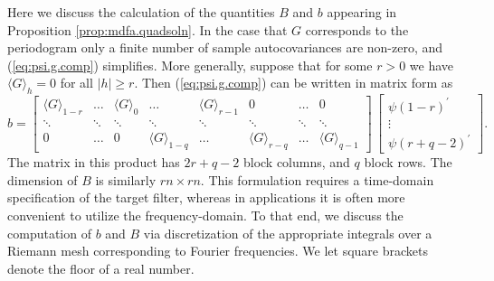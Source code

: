 \documentclass[a4paper]{book}
\begin{document}
 Here we discuss the calculation of the quantities $B$ and $b$ appearing in 
 Proposition \ref{prop:mdfa.quadsoln}.  In the case that $G$ corresponds to
 the periodogram  only a finite number of sample
 autocovariances are non-zero,  and (\ref{eq:psi.g.comp}) simplifies.
More generally, suppose that for some $r > 0$
 we have ${ \langle G \rangle }_h = 0$ for all $|h| \geq r$.  Then (\ref{eq:psi.g.comp})
 can be written in matrix form as
\[
 b  =  \left[ \begin{array}{cccccccc} { \langle G \rangle }_{1-r} & \ldots &
    { \langle G \rangle }_0 & \ldots & { \langle G \rangle }_{r-1} &  0 & \ldots & 0 \\
    		\ddots & \ddots & \ddots & \ddots & \ddots & \ddots & \ddots & \ddots \\
    		0  &  \ldots & 0 & {\langle G \rangle}_{1-q} & \ldots & { \langle G \rangle }_{r-q} &
    		\ldots &  { \langle G \rangle }_{q-1}  \end{array} \right] \,
    \left[ \begin{array}{c} {\psi (1-r) }^{\prime} \\   \vdots \\ {\psi (r+q-2) }^{\prime}
     \end{array} \right].
\]
 The matrix in this product has $2r+q-2$ block columns, and $q$ block rows.
 The dimension of $B$ is similarly $rn \times rn$.  This formulation requires
 a time-domain specification of the target filter, whereas in applications it is
 often more convenient to utilize the frequency-domain.  To that end, we discuss the 
 computation of $b$ and $B$ via discretization of the appropriate integrals over
 a Riemann mesh corresponding to Fourier frequencies.  We let square brackets
 denote the floor of a real number.
\end{document}

